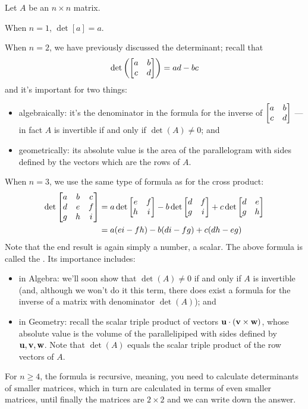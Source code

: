 Let $A$ be an $n\times n$ matrix.  

When $n=1$, $\det[a] = a$.

When $n=2$, we have previously
discussed the determinant; recall that
$$
\det\left( \left[ \begin{matrix} a&b\\c&d \end{matrix} \right] \right) = ad-bc
$$
and it's important for two things:
\begin{itemize}
\item  algebraically:  it's the denominator in the formula for the 
inverse of $\left[ \begin{matrix} a&b\\c&d \end{matrix} \right]$ --- in fact $A$ is invertible if and only
if $\det(A) \neq 0$; and
\item  geometrically: its absolute value is the
area of the parallelogram with sides defined by the vectors
which are the rows of $A$.
\end{itemize}

When $n=3$, we use the same type of formula as for the cross product:
\begin{align*}
\det\left[ \begin{matrix} a&b&c\\d&e&f\\g&h&i \end{matrix} \right] &= a\det\left[ \begin{matrix} e&f\\h&i \end{matrix} \right] - b\det\left[ \begin{matrix} d&f\\g&i \end{matrix} \right] + c\det\left[ \begin{matrix} d&e\\g&h \end{matrix} \right]\\
&= a(ei-fh) - b(di-fg) +c(dh-eg)
\end{align*}
Note that the end result is again simply  a number, a scalar.  The above
formula is called the .
Its importance includes:
\begin{itemize}
\item in Algebra:  we'll soon show that $\det(A) \neq 0$ if and only if $A$
is invertible (and, although we won't do it this term, there does exist
a formula for the inverse of a matrix with denominator $\det(A)$); and
\item in Geometry:  recall the scalar triple product of vectors $\mathbf{u} \cdot (\mathbf{v} \times \mathbf{w})$, whose absolute value is the volume of the parallelipiped with sides defined by $\mathbf{u}, \mathbf{v}, \mathbf{w}$.  Note that $\det(A)$ equals
the scalar triple product of the row vectors of $A$.
\end{itemize}

For $n\geq 4$, the formula is recursive, meaning, you need to calculate 
determinants of smaller matrices, which in turn are calculated in terms
of even smaller matrices, until finally the matrices are $2\times 2$
and we can write down the answer.

